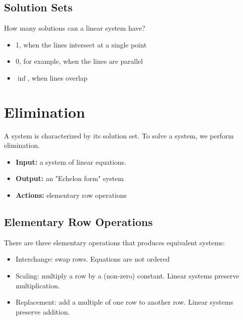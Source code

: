 \documentclass[11pt]{article}
\theoremstyle{definition}
\begin{document}
\subsection{Solution Sets}
How many solutions can a linear system have?

\begin{itemize}
    \item 1, when the lines intersect at a single point
    \item 0, for example, when the lines are parallel
    \item $\inf$, when lines overlap
\end{itemize}



\vspace{0.5em}
\noindent{}
\section{Elimination}
A system is characterized by its solution set. To solve a system, we perform elimination.

\begin{itemize}
    \item \textbf{Input:} a system of linear equations.
    \item \textbf{Output:} an "Echelon form" system
    \item \textbf{Actions:} elementary row operations
\end{itemize}

\subsection{Elementary Row Operations}
There are three elementary operations that produces equivalent systems:

\begin{itemize}
    \item Interchange: swap rows. Equations are not ordered
    \item Scaling: multiply a row by a (non-zero) constant. Linear systems preserve multiplication.
    \item Replacement: add a multiple of one row to another row. Linear systems preserve addition.
\end{itemize}
\end{document}
